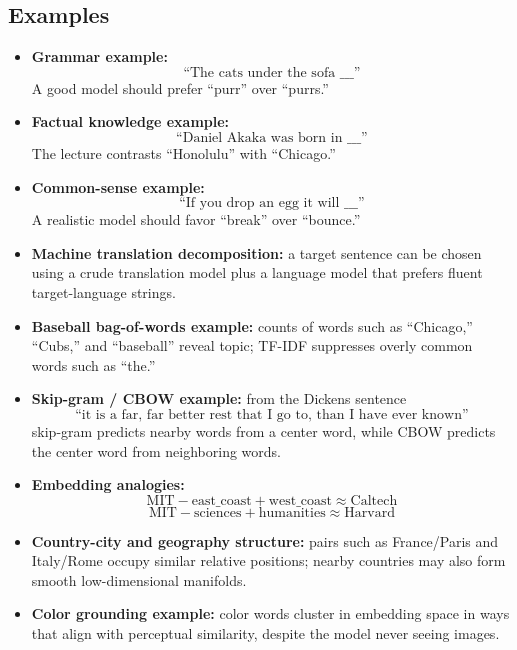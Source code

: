\documentclass[11pt]{article}
\begin{document}
\subsection{Examples}
\begin{itemize}
    \item \textbf{Grammar example:}
    \[
    \text{``The cats under the sofa \_\_\_''}
    \]
    A good model should prefer ``purr'' over ``purrs.''
    \item \textbf{Factual knowledge example:}
    \[
    \text{``Daniel Akaka was born in \_\_\_''}
    \]
    The lecture contrasts ``Honolulu'' with ``Chicago.''
    \item \textbf{Common-sense example:}
    \[
    \text{``If you drop an egg it will \_\_\_''}
    \]
    A realistic model should favor ``break'' over ``bounce.''
    \item \textbf{Machine translation decomposition:} a target sentence can be chosen using a crude translation model plus a language model that prefers fluent target-language strings.
    \item \textbf{Baseball bag-of-words example:} counts of words such as ``Chicago,'' ``Cubs,'' and ``baseball'' reveal topic; TF-IDF suppresses overly common words such as ``the.''
    \item \textbf{Skip-gram / CBOW example:} from the Dickens sentence
    \[
    \text{``it is a far, far better rest that I go to, than I have ever known''}
    \]
    skip-gram predicts nearby words from a center word, while CBOW predicts the center word from neighboring words.
    \item \textbf{Embedding analogies:}
    \[
    \text{MIT} - \text{east\_coast} + \text{west\_coast} \approx \text{Caltech}
    \]
    \[
    \text{MIT} - \text{sciences} + \text{humanities} \approx \text{Harvard}
    \]
    \item \textbf{Country-city and geography structure:} pairs such as France/Paris and Italy/Rome occupy similar relative positions; nearby countries may also form smooth low-dimensional manifolds.
    \item \textbf{Color grounding example:} color words cluster in embedding space in ways that align with perceptual similarity, despite the model never seeing images.
\end{itemize}
\end{document}
